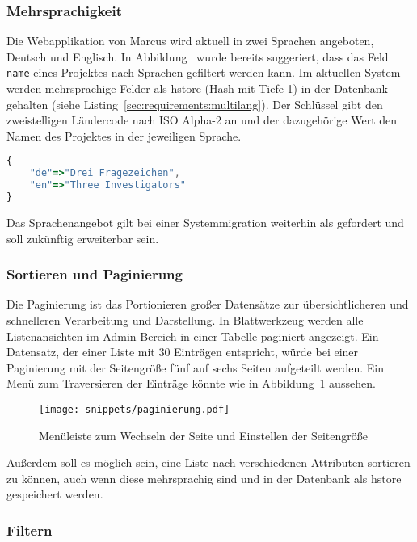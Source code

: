 \subsubsection{Mehrsprachigkeit}
Die Webapplikation von Marcus wird aktuell in zwei Sprachen angeboten, Deutsch und Englisch.
In Abbildung~ wurde bereits suggeriert, dass das Feld \texttt{name} eines Projektes nach Sprachen gefiltert werden kann.
Im aktuellen System werden mehrsprachige Felder
als hstore (Hash mit Tiefe 1) in der Datenbank gehalten (siehe Listing~\ref{sec:requirements:multilang}). Der Schlüssel gibt den zweistelligen Ländercode nach ISO Alpha-2 \cite{iso-alpha-2} an
und der dazugehörige Wert den Namen des Projektes in der jeweiligen Sprache.

\begin{lstlisting}[language=JavaScript,float=h!,caption={Speicherung der Projektnamen als hstore}, label={sec:requirements:multilang}]
{
    "de"=>"Drei Fragezeichen",
    "en"=>"Three Investigators"
}
\end{lstlisting}

Das Sprachenangebot gilt bei einer Systemmigration weiterhin als gefordert und soll zukünftig erweiterbar sein.

\subsubsection{Sortieren und Paginierung}
Die Paginierung ist das Portionieren großer Datensätze zur übersichtlicheren und schnelleren Verarbeitung und Darstellung.
In Blattwerkzeug werden alle Listenansichten im Admin Bereich in einer Tabelle paginiert angezeigt.
Ein Datensatz, der einer Liste mit 30 Einträgen entspricht, würde bei einer Paginierung mit der Seitengröße fünf auf sechs Seiten aufgeteilt werden.
Ein Menü zum Traversieren der Einträge könnte wie in Abbildung~\ref{req:view:pagination} aussehen.

\begin{figure}[h!]
    \centering
    \texttt{[image: snippets/paginierung.pdf]}
    \caption{Menüleiste zum Wechseln der Seite und Einstellen der Seitengröße}
    \label{req:view:pagination}
\end{figure}

Außerdem soll es möglich sein, eine Liste nach verschiedenen Attributen sortieren zu können, auch wenn diese mehrsprachig sind und
in der Datenbank als hstore gespeichert werden.

\subsubsection{Filtern}

